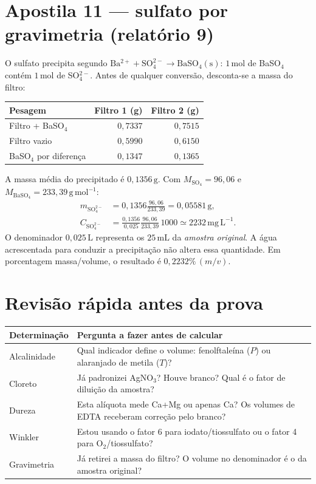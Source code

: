 \documentclass[11pt,a4paper]{article}
\newcommand{\mgL}{\mathrm{mg\,L^{-1}}}
\newcommand{\mL}{\mathrm{mL}}
\begin{document}
\section{Apostila 11 --- sulfato por gravimetria (relatório 9)}
O sulfato precipita segundo $\mathrm{Ba^{2+}+SO_4^{2-}\rightarrow BaSO_4(s)}$: $1\,\mathrm{mol}$ de BaSO$_4$ contém $1\,\mathrm{mol}$ de SO$_4^{2-}$. Antes de qualquer conversão, desconta-se a massa do filtro:
\begin{center}
\begin{tabular}{@{}lrr@{}}\toprule
Pesagem & Filtro 1 (g) & Filtro 2 (g)\\\midrule
Filtro + BaSO$_4$ & $0{,}7337$ & $0{,}7515$\\
Filtro vazio & $0{,}5990$ & $0{,}6150$\\
BaSO$_4$ por diferença & $0{,}1347$ & $0{,}1365$\\\bottomrule
\end{tabular}
\end{center}
A massa média do precipitado é $0{,}1356\,\mathrm{g}$. Com $M_{\mathrm{SO_4}}=96{,}06$ e $M_{\mathrm{BaSO_4}}=233{,}39\,\mathrm{g\,mol^{-1}}$:
\begin{align}
m_{\mathrm{SO_4^{2-}}}
&=0{,}1356\frac{96{,}06}{233{,}39}=0{,}05581\,\mathrm{g},\\
C_{\mathrm{SO_4^{2-}}}
&=\frac{0{,}1356}{0{,}025}\frac{96{,}06}{233{,}39}\,1000
\simeq2232\,\mgL.
\end{align}
O denominador $0{,}025\,\mathrm{L}$ representa os $25\,\mL$ da \emph{amostra original}. A água acrescentada para conduzir a precipitação não altera essa quantidade. Em porcentagem massa/volume, o resultado é $0{,}2232\%\,(m/v)$.

\section*{Revisão rápida antes da prova}
\begin{tabularx}{\linewidth}{@{}lX@{}}\toprule
Determinação & Pergunta a fazer antes de calcular\\\midrule
Alcalinidade & Qual indicador define o volume: fenolftaleína ($P$) ou alaranjado de metila ($T$)?\\
Cloreto & Já padronizei AgNO$_3$? Houve branco? Qual é o fator de diluição da amostra?\\
Dureza & Esta alíquota mede Ca+Mg ou apenas Ca? Os volumes de EDTA receberam correção pelo branco?\\
Winkler & Estou usando o fator 6 para iodato/tiossulfato ou o fator 4 para O$_2$/tiossulfato?\\
Gravimetria & Já retirei a massa do filtro? O volume no denominador é o da amostra original?\\\bottomrule
\end{tabularx}
\end{document}
